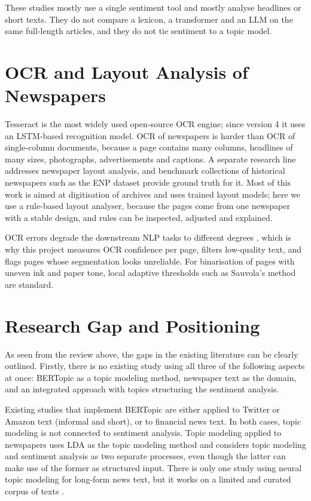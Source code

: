 These studies mostly use a single sentiment tool and mostly analyse headlines or short texts. They do not compare a lexicon, a transformer and an LLM on the same full-length articles, and they do not tie sentiment to a topic model.

\section{OCR and Layout Analysis of Newspapers}

Tesseract \cite{smith2007} is the most widely used open-source OCR engine; since version 4 it uses an LSTM-based recognition model. OCR of newspapers is harder than OCR of single-column documents, because a page contains many columns, headlines of many sizes, photographs, advertisements and captions. A separate research line addresses newspaper layout analysis, and benchmark collections of historical newspapers such as the ENP dataset \cite{clausner2015} provide ground truth for it. Most of this work is aimed at digitisation of archives and uses trained layout models; here we use a rule-based layout analyser, because the pages come from one newspaper with a stable design, and rules can be inspected, adjusted and explained.

OCR errors degrade the downstream NLP tasks to different degrees \cite{lopresti2009,vanstrien2020}, which is why this project measures OCR confidence per page, filters low-quality text, and flags pages whose segmentation looks unreliable. For binarisation of pages with uneven ink and paper tone, local adaptive thresholds such as Sauvola's method \cite{sauvola2000} are standard.

\section{Research Gap and Positioning}

As seen from the review above, the gaps in the existing literature can be clearly outlined. Firstly, there is no existing study using all three of the following aspects at once: BERTopic as a topic modeling method, newspaper text as the domain, and an integrated approach with topics structuring the sentiment analysis.

Existing studies that implement BERTopic \cite{grootendorst2022,egger2022,turan2024,zhu2024} are either applied to Twitter or Amazon text (informal and short), or to financial news text. In both cases, topic modeling is not connected to sentiment analysis. Topic modeling applied to newspapers \cite{gouliev2024,yadav2022} uses LDA as the topic modeling method and considers topic modeling and sentiment analysis as two separate processes, even though the latter can make use of the former as structured input. There is only one study using neural topic modeling for long-form news text, but it works on a limited and curated corpus of texts \cite{dsh2025}.

